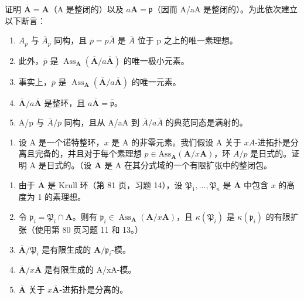证明 \(\overline{\mathbf{A}} = \mathbf{A}\)（A 是整闭的）以及 \(a\mathbf{A} = \mathfrak{p}\)（因而 A/aA 是整闭的）。为此依次建立以下断言：

\begin{enumerate}
\def\labelenumi{\alph{enumi})}
\item
  \(A_{p}\) 与 \(\overline{A}_{p}\) 同构，且 \(\overline{p} = p\overline{A}\) 是 \(\overline{A}\) 位于 p 之上的唯一素理想。
\item
  此外，\(\overline{p}\) 是 \(\operatorname{Ass}_{\mathbf{A}}(\overline{\mathbf{A}}/a\overline{\mathbf{A}})\) 的唯一极小元素。
\item
  事实上，\(\overline{p}\) 是 \(\operatorname{Ass}_{\mathbf{A}}(\overline{\mathbf{A}}/a\overline{\mathbf{A}})\) 的唯一元素。
\item
  \(\overline{\mathbf{A}} / a\overline{\mathbf{A}}\) 是整环，且 \(a\overline{\mathbf{A}} = \overline{\mathfrak{p}}\)。
\item
  A/p 与 \(\overline{A}/\overline{p}\) 同构，且从 A/aA 到 \(\overline{A}/a\overline{A}\) 的典范同态是满射的。
\end{enumerate}

\begin{enumerate}
\def\labelenumi{\arabic{enumi})}
\setcounter{enumi}{17}
\tightlist
\item
  设 A 是一个诺特整环，\(x\) 是 A 的非零元素。我们假设 A 关于 \(xA\)-进拓扑是分离且完备的，并且对于每个素理想 \(p \in \mathrm{Ass}_{\mathbf{A}}(\mathbf{A} / x\mathbf{A})\)，环 \(A/p\) 是日式的。证明 A 是日式的。（设 \(\overline{\mathbf{A}}\) 是 A 在其分式域的一个有限扩张中的整闭包。
\end{enumerate}

\begin{enumerate}
\def\labelenumi{\alph{enumi})}
\item
  由于 \(\overline{\mathbf{A}}\) 是 Krull 环（第 81 页，习题 14），设 \(\mathfrak{P}_1, \ldots, \mathfrak{P}_n\) 是 \(\overline{\mathbf{A}}\) 中包含 \(x\) 的高度为 1 的素理想。
\item
  令 \(\mathfrak{p}_i = \mathfrak{P}_i \cap \mathbf{A}\)。则有 \(\mathfrak{p}_i \in \operatorname{Ass}_{\mathbf{A}}(\mathbf{A} / x\mathbf{A})\)，且 \(\kappa(\mathfrak{P}_i)\) 是 \(\kappa(\mathfrak{p}_i)\) 的有限扩张（使用第 80 页习题 11 和 13。）
\item
  \(\overline{\mathbf{A}} / \mathfrak{P}_i\) 是有限生成的 \(\mathbf{A} / \mathfrak{p}_i\)-模。
\item
  \(\overline{\mathbf{A}} / x\overline{\mathbf{A}}\) 是有限生成的 A/xA-模。
\item
  \(\overline{\mathbf{A}}\) 关于 \(x\overline{\mathbf{A}}\)-进拓扑是分离的。
\end{enumerate}

